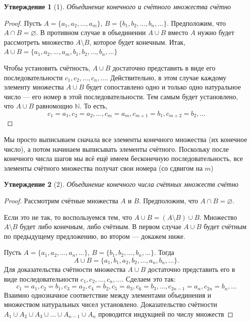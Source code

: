 \documentclass[a4paper,12pt]{article}
\newtheorem{proposition}{Утверждение} %
\theoremstyle{definition}
\theoremstyle{plain}
\theoremstyle{remark}
\begin{document}
	\begin{proposition}[1]
		Объединение конечного и счётного множества счётно
	\end{proposition}
	\begin{proof}
		Пусть $A = \{a_1, a_2, \dots, a_m\}$, $B = \{b_1, b_2, \dots, b_n, \dots\}$. Предположим, что $A \cap B = \varnothing$. В противном случае в объединении $A \cup B$ вместо $A$ нужно будет рассмотреть множество $A \setminus B$, которое будет конечным. Итак, $A \cup B = \{a_1, a_2, \dots, a_m, b_1, b_2, \dots, b_n, \dots\}$
		
		\medskip
		Чтобы установить счётность, $A \cup B$ достаточно представить в виде его последовательности $c_1, c_2, \dots, c_n, \dots$. Действительно, в этом случае каждому элементу множества $A \cup B$ будет сопоставлено одно и только одно натуральное число — его номер в этой последовательности. Тем самым будет установлено, что $A \cup B$ равномощно $\mathbb{N}$. То есть,
		\[
		c_1 = a_1, c_2 = a_2, \dots, c_m = a_m, c_{m+1} = b_1, c_{m+2} = b_2, \dots
		\]
	\end{proof}
	
	\begin{tcolorbox}[colback=green!5, colframe=green!50!black, title=Пояснение к доказательству]
		Мы просто выписываем сначала все элементы конечного множества (их конечное число), а потом начинаем выписывать элементы счётного. Поскольку после конечного числа шагов мы всё ещё имеем бесконечную последовательность, все элементы счётного множества получат свои номера (со сдвигом на $m$)
	\end{tcolorbox}
	
	\begin{proposition}[2]
		Объединение конечного числа счётных множеств счётно
	\end{proposition}
	\begin{proof}
		Рассмотрим счётные множества $A$ и $B$. Предположим, что $A \cap B = \varnothing$.
		
		Если это не так, то воспользуемся тем, что $A \cup B = (A \setminus B) \cup B$. Множество $A \setminus B$ будет либо конечным, либо счётным. В первом случае $A \cup B$ будет счётным по предыдущему предложению, во втором — докажем ниже.
		
		\medskip
		Пусть $A = \{a_1, a_2, \dots, a_n, \dots\}$, $B = \{b_1, b_2, \dots, b_n, \dots\}$. Тогда
		\[
		A \cup B = \{a_1, b_1, a_2, b_2, \dots, a_n, b_n, \dots\}.
		\]
		Для доказательства счётности множества $A \cup B$ достаточно представить его в виде последовательности $c_1, c_2, \dots, c_n, \dots$. Сделаем это так:
		\[
		c_1 = a_1, c_2 = b_1, c_3 = a_2, c_4 = b_2, c_5 = a_3, c_6 = b_3, \dots, c_{2n-1} = a_n, c_{2n} = b_n, \dots
		\]
		Взаимно однозначное соответствие между элементами объединения и множеством натуральных чисел установлено. Доказательство счётности $A_1 \cup A_2 \cup A_3 \cup \dots \cup A_{n-1} \cup A_n$ проводится индукцией по числу множеств
	\end{proof}
	
\end{document}
